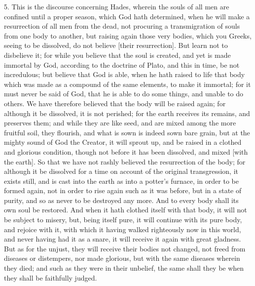 5. This is the discourse concerning Hades, wherein the souls of all men
are confined until a proper season, which God hath determined, when he
will make a resurrection of all men from the dead, not procuring a
transmigration of souls from one body to another, but raising again those
very bodies, which you Greeks, seeing to be dissolved, do not believe
[their resurrection]. But learn not to disbelieve it; for while you
believe that the soul is created, and yet is made immortal by God,
according to the doctrine of Plato, and this in time, be not incredulous;
but believe that God is able, when he hath raised to life that body which
was made as a compound of the same elements, to make it immortal; for it
must never be said of God, that he is able to do some things, and unable
to do others. We have therefore believed that the body will be raised
again; for although it be dissolved, it is not perished; for the earth
receives its remains, and preserves them; and while they are like seed,
and are mixed among the more fruitful soil, they flourish, and what is
sown is indeed sown bare grain, but at the mighty sound of God the
Creator, it will sprout up, and be raised in a clothed and glorious
condition, though not before it has been dissolved, and mixed [with the
earth]. So that we have not rashly believed the resurrection of the body;
for although it be dissolved for a time on account of the original
transgression, it exists still, and is cast into the earth as into a
potter's furnace, in order to be formed again, not in order to rise again
such as it was before, but in a state of purity, and so as never to be
destroyed any more. And to every body shall its own soul be restored. And
when it hath clothed itself with that body, it will not be subject to
misery, but, being itself pure, it will continue with its pure body, and
rejoice with it, with which it having walked righteously now in this
world, and never having had it as a snare, it will receive it again with
great gladness. But as for the unjust, they will receive their bodies not
changed, not freed from diseases or distempers, nor made glorious, but
with the same diseases wherein they died; and such as they were in their
unbelief, the same shall they be when they shall be faithfully judged.


